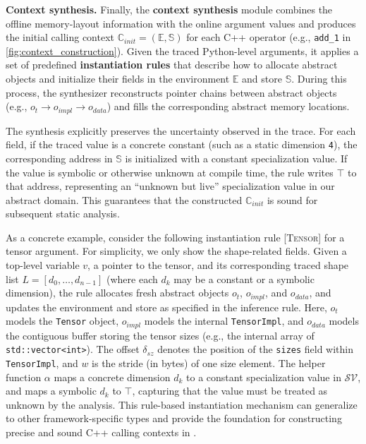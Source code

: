 \textbf{Context synthesis.}
Finally, the \textbf{context synthesis} module combines the offline memory-layout information with the online argument values and produces the initial calling context $\mathbb{C}_{init} = (\mathbb{E}, \mathbb{S})$ for each C++ operator (e.g., \texttt{add\_1} in \autoref{fig:context_construction}).
Given the traced Python-level arguments, it applies a set of predefined \textbf{instantiation rules} that describe how to allocate abstract objects and initialize their fields in the environment $\mathbb{E}$ and store $\mathbb{S}$.
During this process, the synthesizer reconstructs pointer chains between abstract objects (e.g., $o_{t} \rightarrow o_{impl} \rightarrow o_{data}$) and fills the corresponding abstract memory locations.

The synthesis explicitly preserves the uncertainty observed in the trace.
For each field, if the traced value is a concrete constant (such as a static dimension \texttt{4}), the corresponding address in $\mathbb{S}$ is initialized with a constant specialization value.
If the value is symbolic or otherwise unknown at compile time, the rule writes $\top$ to that address, representing an “unknown but live” specialization value in our abstract domain.
This guarantees that the constructed $\mathbb{C}_{init}$ is sound for subsequent static analysis.

As a concrete example, consider the following instantiation rule \textsc{[Tensor]} for a tensor argument. 
For simplicity, we only show the shape-related fields.
Given a top-level variable $v$, a pointer to the tensor, and its corresponding traced shape list $L = [d_0, \dots, d_{n-1}]$ (where each $d_k$ may be a constant or a symbolic dimension), the rule allocates fresh abstract objects $o_t$, $o_{impl}$, and $o_{data}$, and updates the environment and store as specified in the inference rule.
Here, $o_t$ models the \texttt{Tensor} object, $o_{impl}$ models the internal \texttt{TensorImpl}, and $o_{data}$ models the contiguous buffer storing the tensor sizes (e.g., the internal array of \texttt{std::vector<int>}).
The offset $\delta_{sz}$ denotes the position of the \texttt{sizes} field within \texttt{TensorImpl}, and $w$ is the stride (in bytes) of one size element.
The helper function $\alpha$ maps a concrete dimension $d_k$ to a constant specialization value in $\mathcal{SV}$, and maps a symbolic $d_k$ to $\top$, capturing that the value must be treated as unknown by the analysis.
This rule-based instantiation mechanism can generalize to other framework-specific types and provide the foundation for constructing precise and sound C++ calling contexts in \mysys.

